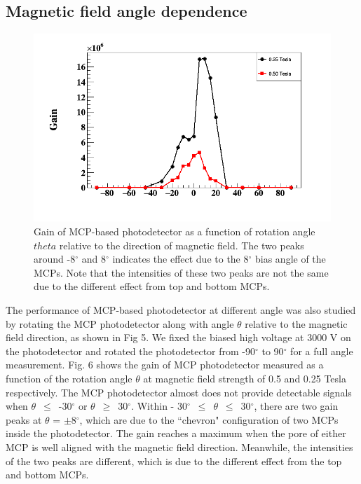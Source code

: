\documentclass[preprint,5p]{elsarticle}
\begin{document}
\subsection{Magnetic field angle dependence}\label{subsec_theta}

\begin{figure}[tbp]
\centering 
\includegraphics[scale=0.35]{fig/MCPs_gain_theta_B.png}
\caption{Gain of MCP-based photodetector as a function of rotation angle 
   $theta$ relative to the direction of magnetic field. The two peaks around 
-8$^{\circ}$ and 8$^{\circ}$ indicates the effect due to the 8$^{\circ}$ bias 
angle of the MCPs. Note that the intensities of these two peaks are not the 
same due to the different effect from top and bottom MCPs.} 
\label{fig:MCPs_gain_theta_B}
\end{figure}
The performance of MCP-based photodetector at different angle was also studied 
by rotating the MCP photodetector along with angle $\theta$ relative to the 
magnetic field direction, as shown in Fig 5. We fixed the biased high voltage 
at 3000 V on the photodetector and rotated the photodetector from -90$^{\circ}$ 
to 90$^{\circ}$ for a full angle measurement. Fig. 6 shows the gain of MCP 
photodetector measured as a function of the rotation angle $\theta$ at magnetic 
field strength of 0.5 and 0.25 Tesla respectively. The MCP photodetector almost 
does not provide detectable signals when $\theta$~$\leq$~-30$^{\circ}$ or 
$\theta$~$\geq$~30$^{\circ}$. Within - 
30$^{\circ}$~$\leq$~$\theta$~$\leq$~30$^{\circ}$, there are two gain peaks at 
$\theta$ = $\pm$8$^{\circ}$, which are due to the ``chevron" configuration of 
two MCPs inside the photodetector. The gain reaches a maximum when the pore of 
either MCP is well aligned with the magnetic field direction.  Meanwhile, the 
intensities of the two peaks are different, which is due to the different 
effect from the top and bottom MCPs.
\end{document}
